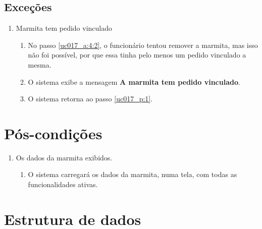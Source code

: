 \subsection{Exceções}

\begin{enumerate}[label=E\arabic*]
	\item Marmita tem pedido vinculado \label{uc017_e:1}
	\begin{enumerate}[label*=.\arabic*]
		\item[] No passo \ref{uc017_a:4:2}, o funcionário tentou remover a marmita, mas isso não foi possível, por que essa tinha pelo menos um pedido vinculado a mesma.
		\item O sistema exibe a mensagem \textbf{A marmita tem pedido vinculado}.
		\item O sistema retorna ao passo \ref{uc017_p:1}.
	\end{enumerate}
\end{enumerate}

\section{Pós-condições}

\begin{enumerate}
	\item Os dados da marmita exibidos.
	\begin{enumerate}
		\item O sistema carregará os dados da marmita, numa tela, com todas as funcionalidades ativas.
	\end{enumerate}
\end{enumerate}

\section{Estrutura de dados}

